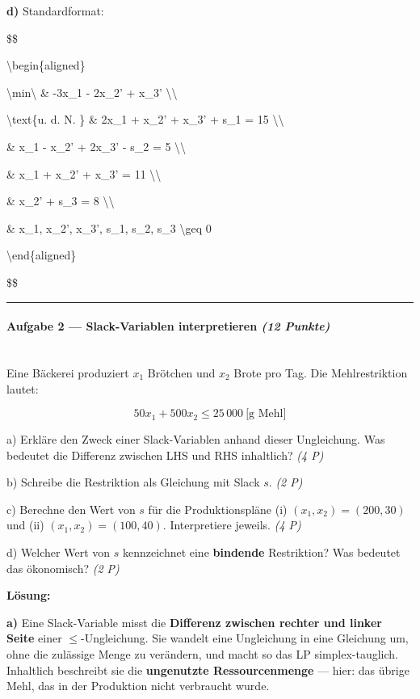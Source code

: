 \documentclass[11pt, a4paper]{article}
\begin{document}
\textbf{d)} Standardformat:


\$\$

\textbackslash{}begin\{aligned\}

\textbackslash{}min\textbackslash{} \& -3x\_1 - 2x\_2' + x\_3' \textbackslash{}\textbackslash{}

\textbackslash{}text\{u. d. N. \} \& 2x\_1 + x\_2' + x\_3' + s\_1 = 15 \textbackslash{}\textbackslash{}

\& x\_1 - x\_2' + 2x\_3' - s\_2 = 5 \textbackslash{}\textbackslash{}

\& x\_1 + x\_2' + x\_3' = 11 \textbackslash{}\textbackslash{}

\& x\_2' + s\_3 = 8 \textbackslash{}\textbackslash{}

\& x\_1, x\_2', x\_3', s\_1, s\_2, s\_3 \textbackslash{}geq 0

\textbackslash{}end\{aligned\}

\$\$



\noindent\textcolor{rulegray}{\rule{\linewidth}{0.4pt}}


\paragraph{Aufgabe 2 — Slack-Variablen interpretieren \textit{(12 Punkte)}}\mbox{}\\[2pt]

Eine Bäckerei produziert $x_1$ Brötchen und $x_2$ Brote pro Tag. Die Mehlrestriktion lautet:


\[
50 x_1 + 500 x_2 \leq 25\,000\ \text{[g Mehl]}
\]


a) Erkläre den Zweck einer Slack-Variablen anhand dieser Ungleichung. Was bedeutet die Differenz zwischen LHS und RHS inhaltlich? \textit{(4 P)}

b) Schreibe die Restriktion als Gleichung mit Slack $s$. \textit{(2 P)}

c) Berechne den Wert von $s$ für die Produktionspläne (i) $(x_1, x_2) = (200, 30)$ und (ii) $(x_1, x_2) = (100, 40)$. Interpretiere jeweils. \textit{(4 P)}

d) Welcher Wert von $s$ kennzeichnet eine \textbf{bindende} Restriktion? Was bedeutet das ökonomisch? \textit{(2 P)}


\textbf{Lösung:}


\textbf{a)} Eine Slack-Variable misst die \textbf{Differenz zwischen rechter und linker Seite} einer $\leq$-Ungleichung. Sie wandelt eine Ungleichung in eine Gleichung um, ohne die zulässige Menge zu verändern, und macht so das LP simplex-tauglich. Inhaltlich beschreibt sie die \textbf{ungenutzte Ressourcenmenge} — hier: das übrige Mehl, das in der Produktion nicht verbraucht wurde.
\end{document}
